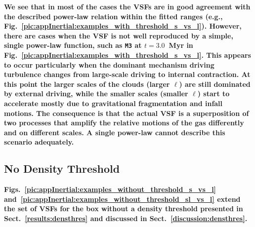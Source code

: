 \textbf{
    We see that in most of the cases the VSFs are in good agreement with the described power-law relation within the fitted ranges (e.g., Fig.~\ref{pic:appInertial:examples_with_threshold_s_vs_l}). 
    However, there are cases when the VSF is not well reproduced by a
    simple, single power-law function, such as 
\texttt{M3} at $t=3.0$~Myr in
Fig.~\ref{pic:appInertial:examples_with_threshold_s_vs_l}.
    This appears to occur particularly when the dominant mechanism
    driving turbulence changes from large-scale driving to internal
    contraction. At this point
the 
    larger scales 
of the clouds (larger $\ell$) are still dominated by external driving,
while the 
    smaller scales (smaller $\ell$) start to accelerate mostly due to
    gravitational fragmentation and infall motions.
    The consequence is that the actual VSF is a superposition of two processes that amplify the relative motions of the gas differently and on different scales.
    A single power-law 
    cannot describe 
this scenario adequately. 
}

\subsection{No Density Threshold} \label{Bsub:full}
\textbf{Figs.~\ref{pic:appInertial:examples_without_threshold_s_vs_l}
and~\ref{pic:appInertial:examples_without_threshold_sl_vs_l} extend
the set of VSFs for the box without a density threshold presented in
Sect.~\ref{results:densthres} and discussed in Sect.~\ref{discussion:densthres}.}

